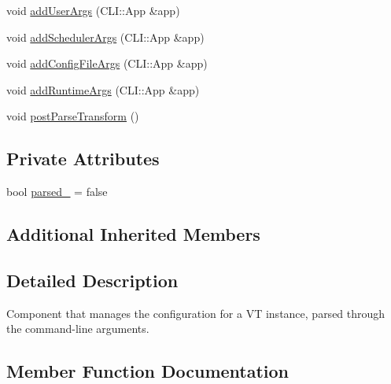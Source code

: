\begin{DoxyCompactItemize}
\item 
void \hyperlink{structvt_1_1arguments_1_1_arg_config_aa578460e6783d03ce25e349f8affea99}{add\+User\+Args} (C\+L\+I\+::\+App \&app)
\item 
void \hyperlink{structvt_1_1arguments_1_1_arg_config_ad41d94608d841c18dd302c80ed10c52d}{add\+Scheduler\+Args} (C\+L\+I\+::\+App \&app)
\item 
void \hyperlink{structvt_1_1arguments_1_1_arg_config_a05ce6db9c65585991e2e6e2d741b9dc7}{add\+Config\+File\+Args} (C\+L\+I\+::\+App \&app)
\item 
void \hyperlink{structvt_1_1arguments_1_1_arg_config_a7d5026013c8a56d2684270b0bda83c2b}{add\+Runtime\+Args} (C\+L\+I\+::\+App \&app)
\item 
void \hyperlink{structvt_1_1arguments_1_1_arg_config_a688dc6a1e88d8544e2ab41b4db15d8cd}{post\+Parse\+Transform} ()
\end{DoxyCompactItemize}
\subsection*{Private Attributes}
\begin{DoxyCompactItemize}
\item 
bool \hyperlink{structvt_1_1arguments_1_1_arg_config_a710f4894651d38778f924c5d5f340d96}{parsed\+\_\+} = false
\end{DoxyCompactItemize}
\subsection*{Additional Inherited Members}


\subsection{Detailed Description}
Component that manages the configuration for a VT instance, parsed through the command-\/line arguments. 

\subsection{Member Function Documentation}
\mbox{\label{structvt_1_1arguments_1_1_arg_config_a88f975427c3408ac8ada2add79fb9692}} 
